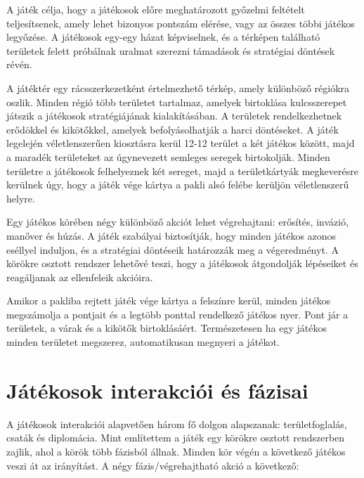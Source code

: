 \documentclass[
]{thesis-ekf}
\theoremstyle{definition}
\theoremstyle{remark}
\begin{document}
A játék célja, hogy a játékosok előre meghatározott győzelmi feltételt teljesítsenek, amely lehet bizonyos pontszám elérése, vagy az összes többi játékos legyőzése. A játékosok egy-egy házat képviselnek, és a térképen található területek felett próbálnak uralmat szerezni támadások és stratégiai döntések révén. 

A játéktér egy rácsszerkezetként értelmezhető térkép, amely különböző régiókra oszlik. Minden régió több területet tartalmaz, amelyek birtoklása kulcsszerepet játszik a játékosok stratégiájának kialakításában. A területek rendelkezhetnek erődökkel és kikötőkkel, amelyek befolyásolhatják a harci döntéseket. A játék legelején véletlenszerűen kiosztásra kerül 12-12 terület a két játékos között, majd a maradék területeket az úgynevezett semleges seregek birtokolják. Minden területre a játékosok felhelyeznek két sereget, majd a területkártyák megkeverésre kerülnek úgy, hogy a játék vége kártya a pakli alsó felébe kerüljön véletlenszerű helyre.

Egy játékos körében négy különböző akciót lehet végrehajtani: erősítés, invázió, manőver és húzás. A játék szabályai biztosítják, hogy minden játékos azonos eséllyel induljon, és a stratégiai döntéseik határozzák meg a végeredményt. A körökre osztott rendszer lehetővé teszi, hogy a játékosok átgondolják lépéseiket és reagáljanak az ellenfeleik akcióira.

Amikor a pakliba rejtett játék vége kártya a felszínre kerül, minden játékos megszámolja a pontjait és a legtöbb ponttal rendelkező játékos nyer. Pont jár a területek, a várak és a kikötők birtoklásáért. Természetesen ha egy játékos minden területet megszerez, automatikusan megnyeri a játékot.

\section{Játékosok interakciói és fázisai}

A játékosok interakciói alapvetően három fő dolgon alapszanak: területfoglalás, csaták és diplomácia. Mint említettem a játék egy körökre osztott rendszerben zajlik, ahol a körök több fázisból állnak. Minden kör végén a következő játékos veszi át az irányítást. A négy fázis/végrehajtható akció a következő:
\end{document}
